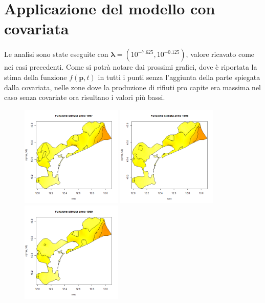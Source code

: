\documentclass[a4paper,11pt,twoside,openright]{book}							%
\begin{document}
\section{Applicazione del modello con covariata}

Le analisi sono state eseguite con $\bm \lambda = (10^{-7.625}, 10^{-0.125})$, valore ricavato come nei casi precedenti. Come si potrà notare dai prossimi grafici, dove è riportata la stima della funzione $f(\bm p,t)$ in tutti i punti senza l'aggiunta della parte spiegata dalla covariata, nelle zone dove la produzione di rifiuti pro capite era massima nel caso senza covariate ora risultano i valori più bassi.
\newpage
\begin{figure}[H]
	\centering
	\includegraphics[width=0.43\textwidth ,height=0.235\textheight]{Immagini/venezia_con_covariate/Anno1997.png}
	\includegraphics[width=0.43\textwidth ,height=0.235\textheight]{Immagini/venezia_con_covariate/Anno1998.png}
	\includegraphics[width=0.43\textwidth ,height=0.235\textheight]{Immagini/venezia_con_covariate/Anno1999.png}

\end{figure}
\end{document}

